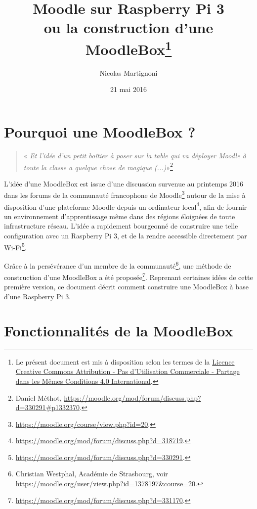 \documentclass[11pt]{article}
\begin{document}
\title{Moodle sur Raspberry Pi 3\\ ou la construction d'une MoodleBox\footnote{Le présent document est mis à disposition selon les termes de la \href{http://creativecommons.org/licenses/by-nc-sa/4.0/}{Licence Creative Commons Attribution - Pas d'Utilisation Commerciale - Partage dans les Mêmes Conditions 4.0 International}.}}
\date{21 mai 2016}
\author{Nicolas Martignoni}
\maketitle

\begingroup
\setlength{\parskip}{0pt}
\tableofcontents
\endgroup

\section{Pourquoi une MoodleBox ?}

\begin{quote}
\noindent « \emph{Et l'idée d'un petit boîtier à poser sur la table qui va déployer Moodle à toute la classe a quelque chose de magique (...)}»\footnote{Daniel Méthot, \url{https://moodle.org/mod/forum/discuss.php?d=330291\#p1332370}.}
\end{quote}

L'idée d'une MoodleBox est issue d'une discussion survenue au printemps 2016 dans les forums de la communauté francophone de Moodle\footnote{\url{https://moodle.org/course/view.php?id=20}.} autour de la mise à disposition d'une plateforme Moodle depuis un ordinateur local\footnote{\url{https://moodle.org/mod/forum/discuss.php?d=318719}.}, afin de fournir un environnement d'apprentissage même dans des régions éloignées de toute infrastructure réseau. L'idée a rapidement bourgeonné de construire une telle configuration avec un Raspberry Pi 3, et de la rendre accessible directement par Wi-Fi\footnote{\url{https://moodle.org/mod/forum/discuss.php?d=330291}.}.

Grâce à la persévérance d'un membre de la communauté\footnote{Christian Westphal, Académie de Strasbourg, voir \url{https://moodle.org/user/view.php?id=1378197&course=20}.}, une méthode de construction d'une MoodleBox a été proposée\footnote{\url{https://moodle.org/mod/forum/discuss.php?d=331170}.}. Reprenant certaines idées de cette première version, ce document décrit comment construire une MoodleBox à base d'une Raspberry Pi 3.

\section{Fonctionnalités de la MoodleBox}
\end{document}
